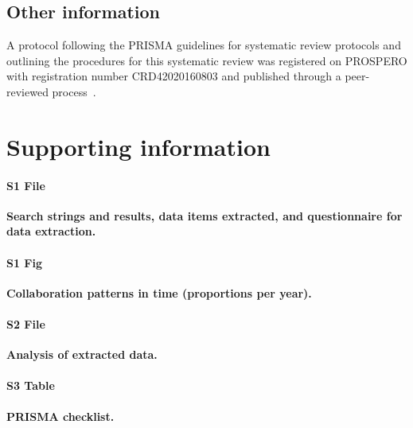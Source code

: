 \documentclass[10pt,letterpaper]{article}
\begin{document}
\subsection*{Other information}
A protocol following the PRISMA guidelines for systematic review protocols and outlining the procedures for this systematic review was registered on PROSPERO with registration number CRD42020160803 and published through a peer-reviewed process~\cite{Azam2020}. 

\section*{Supporting information}

\paragraph*{S1 File}
\label{S1_File}
{\bf Search strings and results, data items extracted, and questionnaire for data extraction.} 

\paragraph*{S1 Fig}
\label{S1_Fig}
{\bf Collaboration patterns in time (proportions per year).}

\paragraph*{S2 File}
\label{S2_File}
{\bf Analysis of extracted data.} 

\paragraph*{S3 Table}
\label{S3_Table}
{\bf PRISMA checklist.} 




\nolinenumbers
\end{document}
